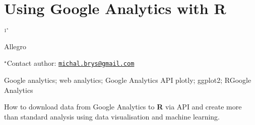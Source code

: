 \documentclass[\main/boa.tex]{subfiles}
\begin{document}
\section{Using Google Analytics with R}

\begin{center}
  {\bf {}$^{1^\star}$}
\end{center}

\vskip 0.3cm

\begin{affiliations}
\begin{enumerate}
\begin{minipage}{0.915\textwidth}
\centering
\item Allegro \\[-2pt]
\end{minipage}
\end{enumerate}
$^\star$Contact author: \href{mailto:michal.brys@gmail.com}{\nolinkurl{michal.brys@gmail.com}}\\
\end{affiliations}

\vskip 0.5cm

\begin{minipage}{0.915\textwidth}
\keywords Google analytics; web analytics; Google Analytics API
\packages plotly; ggplot2; RGoogle Analytics
\end{minipage}

\vskip 0.8cm

How to download data from Google Analytics to \textbf{R} via API and
create more than standard analysis using data visualisation and machine
learning.
\end{document}

